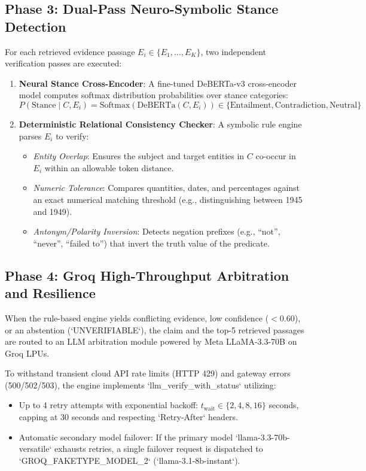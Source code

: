 \documentclass[12pt,a4paper]{report}
\begin{document}
\subsection{Phase 3: Dual-Pass Neuro-Symbolic Stance Detection}
For each retrieved evidence passage $E_i \in \{E_1, \dots, E_K\}$, two independent verification passes are executed:
\begin{enumerate}
    \item \textbf{Neural Stance Cross-Encoder}: A fine-tuned DeBERTa-v3 cross-encoder model computes softmax distribution probabilities over stance categories:
    \[
    P(\text{Stance} \mid C, E_i) = \text{Softmax}\left(\text{DeBERTa}(C, E_i)\right) \in \{\text{Entailment}, \text{Contradiction}, \text{Neutral}\}
    \]
    \item \textbf{Deterministic Relational Consistency Checker}: A symbolic rule engine parses $E_i$ to verify:
    \begin{itemize}
        \item \textit{Entity Overlap}: Ensures the subject and target entities in $C$ co-occur in $E_i$ within an allowable token distance.
        \item \textit{Numeric Tolerance}: Compares quantities, dates, and percentages against an exact numerical matching threshold (e.g., distinguishing between 1945 and 1949).
        \item \textit{Antonym/Polarity Inversion}: Detects negation prefixes (e.g., ``not'', ``never'', ``failed to'') that invert the truth value of the predicate.
    \end{itemize}
\end{enumerate}

\subsection{Phase 4: Groq High-Throughput Arbitration and Resilience}
When the rule-based engine yields conflicting evidence, low confidence ($< 0.60$), or an abstention (`UNVERIFIABLE`), the claim and the top-5 retrieved passages are routed to an LLM arbitration module powered by Meta LLaMA-3.3-70B on Groq LPUs. 

To withstand transient cloud API rate limits (HTTP 429) and gateway errors (500/502/503), the engine implements `llm\_verify\_with\_status` utilizing:
\begin{itemize}
    \item Up to 4 retry attempts with exponential backoff: $t_{\text{wait}} \in \{2, 4, 8, 16\}$ seconds, capping at 30 seconds and respecting `Retry-After` headers.
    \item Automatic secondary model failover: If the primary model `llama-3.3-70b-versatile` exhausts retries, a single failover request is dispatched to `GROQ\_FAKETYPE\_MODEL\_2` (`llama-3.1-8b-instant`).
\end{itemize}
\end{document}
